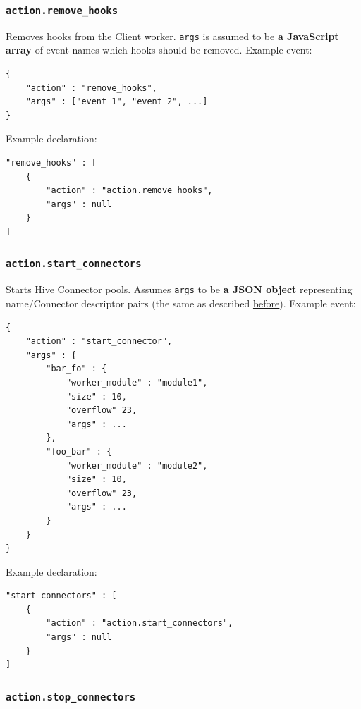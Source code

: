 \documentclass[a4paper]{article}
\begin{document}
\subsubsection{\texttt{action.remove\_hooks}}
\label{sec-9-3-7}

Removes hooks from the Client worker. \texttt{args} is assumed to be \textbf{a JavaScript array} of event names which hooks should be removed. Example event:

\begin{verbatim}
{
    "action" : "remove_hooks",
    "args" : ["event_1", "event_2", ...]
}
\end{verbatim}




\noindent
Example declaration:

\begin{verbatim}
"remove_hooks" : [
    {
        "action" : "action.remove_hooks",
        "args" : null
    }
]
\end{verbatim}
\subsubsection{\texttt{action.start\_connectors}}
\label{sec-9-3-8}

Starts Hive Connector pools. Assumes \texttt{args} to be \textbf{a JSON object} representing name/Connector descriptor pairs (the same as described \hyperref[ref-connectors_config]{before}). Example event:


\begin{verbatim}
{
    "action" : "start_connector",
    "args" : {
        "bar_fo" : {
            "worker_module" : "module1",
            "size" : 10,
            "overflow" 23,
            "args" : ...
        },
        "foo_bar" : {
            "worker_module" : "module2",
            "size" : 10,
            "overflow" 23,
            "args" : ...
        }
    }
}
\end{verbatim}




\noindent
Example declaration:

\begin{verbatim}
"start_connectors" : [
    {
        "action" : "action.start_connectors",
        "args" : null
    }
]
\end{verbatim}
\subsubsection{\texttt{action.stop\_connectors}}
\label{sec-9-3-9}
\end{document}
